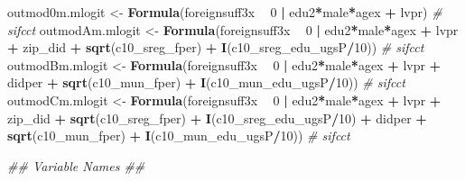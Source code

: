 \documentclass[
]{article}
\newenvironment{Shaded}{\begin{snugshade}}{\end{snugshade}}
\newcommand{\CommentTok}[1]{\textcolor[rgb]{0.56,0.35,0.01}{\textit{#1}}}
\newcommand{\DecValTok}[1]{\textcolor[rgb]{0.00,0.00,0.81}{#1}}
\newcommand{\KeywordTok}[1]{\textcolor[rgb]{0.13,0.29,0.53}{\textbf{#1}}}
\newcommand{\NormalTok}[1]{#1}
\newcommand{\OperatorTok}[1]{\textcolor[rgb]{0.81,0.36,0.00}{\textbf{#1}}}
\newcommand{\StringTok}[1]{\textcolor[rgb]{0.31,0.60,0.02}{#1}}
\begin{document}
\begin{Shaded}
\begin{Highlighting}[]
\NormalTok{outmod0m.mlogit <-}\StringTok{ }\KeywordTok{Formula}\NormalTok{(foreignsuff3x  }\OperatorTok{~}\StringTok{ }\DecValTok{0} \OperatorTok{|}\StringTok{ }\NormalTok{edu2}\OperatorTok{*}\NormalTok{male}\OperatorTok{*}\NormalTok{agex }\OperatorTok{+}\StringTok{ }\NormalTok{lvpr) }\CommentTok{# sifcct}
\NormalTok{outmodAm.mlogit <-}\StringTok{ }\KeywordTok{Formula}\NormalTok{(foreignsuff3x  }\OperatorTok{~}\StringTok{ }\DecValTok{0} \OperatorTok{|}\StringTok{ }\NormalTok{edu2}\OperatorTok{*}\NormalTok{male}\OperatorTok{*}\NormalTok{agex }\OperatorTok{+}\StringTok{ }\NormalTok{lvpr }\OperatorTok{+}\StringTok{  }
\StringTok{                            }\NormalTok{zip_did }\OperatorTok{+}\StringTok{ }\KeywordTok{sqrt}\NormalTok{(c10_sreg_fper) }\OperatorTok{+}\StringTok{ }\KeywordTok{I}\NormalTok{(c10_sreg_edu_ugsP}\OperatorTok{/}\DecValTok{10}\NormalTok{)) }\CommentTok{# sifcct}
\NormalTok{outmodBm.mlogit <-}\StringTok{ }\KeywordTok{Formula}\NormalTok{(foreignsuff3x  }\OperatorTok{~}\StringTok{ }\DecValTok{0} \OperatorTok{|}\StringTok{ }\NormalTok{edu2}\OperatorTok{*}\NormalTok{male}\OperatorTok{*}\NormalTok{agex }\OperatorTok{+}\StringTok{ }\NormalTok{lvpr }\OperatorTok{+}\StringTok{  }
\StringTok{                            }\NormalTok{didper }\OperatorTok{+}\StringTok{ }\KeywordTok{sqrt}\NormalTok{(c10_mun_fper) }\OperatorTok{+}\StringTok{ }\KeywordTok{I}\NormalTok{(c10_mun_edu_ugsP}\OperatorTok{/}\DecValTok{10}\NormalTok{)) }\CommentTok{# sifcct}
\NormalTok{outmodCm.mlogit <-}\StringTok{ }\KeywordTok{Formula}\NormalTok{(foreignsuff3x  }\OperatorTok{~}\StringTok{ }\DecValTok{0} \OperatorTok{|}\StringTok{ }\NormalTok{edu2}\OperatorTok{*}\NormalTok{male}\OperatorTok{*}\NormalTok{agex }\OperatorTok{+}\StringTok{ }\NormalTok{lvpr }\OperatorTok{+}\StringTok{  }
\StringTok{                            }\NormalTok{zip_did }\OperatorTok{+}\StringTok{ }\KeywordTok{sqrt}\NormalTok{(c10_sreg_fper) }\OperatorTok{+}\StringTok{ }\KeywordTok{I}\NormalTok{(c10_sreg_edu_ugsP}\OperatorTok{/}\DecValTok{10}\NormalTok{) }\OperatorTok{+}\StringTok{ }
\StringTok{                            }\NormalTok{didper }\OperatorTok{+}\StringTok{ }\KeywordTok{sqrt}\NormalTok{(c10_mun_fper) }\OperatorTok{+}\StringTok{ }\KeywordTok{I}\NormalTok{(c10_mun_edu_ugsP}\OperatorTok{/}\DecValTok{10}\NormalTok{)) }\CommentTok{# sifcct}

\CommentTok{## Variable Names ##}


\end{Highlighting}
\end{Shaded}
\end{document}

